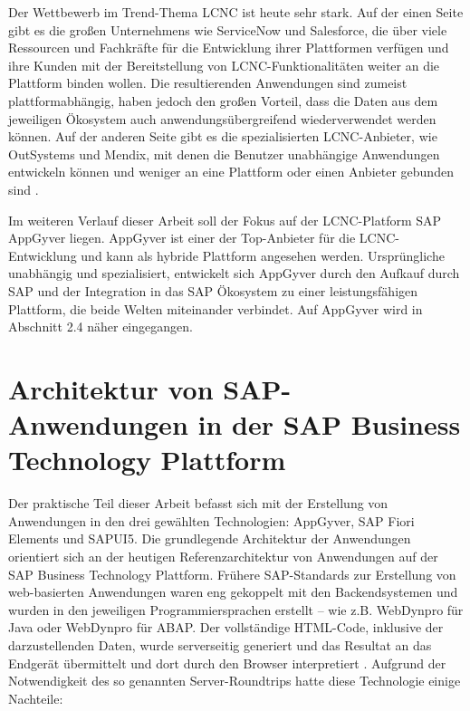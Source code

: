 Der Wettbewerb im Trend-Thema LCNC ist heute sehr stark. Auf der einen Seite gibt es die großen Unternehmens wie ServiceNow und Salesforce, die über viele Ressourcen und Fachkräfte für die Entwicklung ihrer Plattformen verfügen und ihre Kunden mit der Bereitstellung von LCNC-Funktionalitäten weiter an die Plattform binden wollen. Die resultierenden Anwendungen sind zumeist plattformabhängig, haben jedoch den großen Vorteil, dass die Daten aus dem jeweiligen Ökosystem auch anwendungsübergreifend wiederverwendet werden können. Auf der anderen Seite gibt es die spezialisierten LCNC-Anbieter, wie OutSystems und Mendix, mit denen die Benutzer unabhängige Anwendungen entwickeln können und weniger an eine Plattform oder einen Anbieter gebunden sind \cite{lcnc:snflc}.

Im weiteren Verlauf dieser Arbeit soll der Fokus auf der LCNC-Platform SAP AppGyver liegen. AppGyver ist einer der Top-Anbieter für die LCNC-Entwicklung und kann als hybride Plattform angesehen werden. Ursprüngliche unabhängig und spezialisiert, entwickelt sich AppGyver durch den Aufkauf durch SAP und der Integration in das SAP Ökosystem zu einer leistungsfähigen Plattform, die beide Welten miteinander verbindet. Auf AppGyver wird in Abschnitt 2.4 näher eingegangen.

\section{Architektur von SAP-Anwendungen in der SAP Business Technology Plattform}

Der praktische Teil dieser Arbeit befasst sich mit der Erstellung von Anwendungen in den drei gewählten Technologien: AppGyver, SAP Fiori Elements und SAPUI5. Die grundlegende Architektur der Anwendungen orientiert sich an der heutigen Referenzarchitektur von Anwendungen auf der SAP Business Technology Plattform.
Frühere SAP-Standards zur Erstellung von web-basierten Anwendungen waren eng gekoppelt mit den Backendsystemen und wurden in den jeweiligen Programmiersprachen erstellt – wie z.B. WebDynpro für Java oder WebDynpro für ABAP. Der vollständige HTML-Code, inklusive der darzustellenden Daten, wurde serverseitig generiert und das Resultat an das Endgerät übermittelt und dort durch den Browser interpretiert \cite[S.46]{fiori}. Aufgrund der Notwendigkeit des so genannten Server-Roundtrips hatte diese Technologie einige Nachteile:
 
